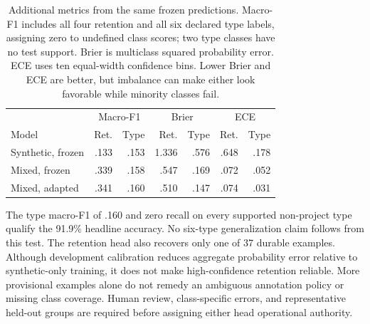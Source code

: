 \begin{table}[htbp]
\centering\small
\begin{tabular}{@{}lrrrrrr@{}}
\toprule
 & \multicolumn{2}{c}{Macro-F1} & \multicolumn{2}{c}{Brier} & \multicolumn{2}{c}{ECE}\\
Model & Ret. & Type & Ret. & Type & Ret. & Type\\
\midrule
Synthetic, frozen & .133 & .153 & 1.336 & .576 & .648 & .178\\
Mixed, frozen & .339 & .158 & .547 & .169 & .072 & .052\\
Mixed, adapted & .341 & .160 & .510 & .147 & .074 & .031\\
\bottomrule
\end{tabular}
\caption{Additional metrics from the same frozen predictions. Macro-F1 includes all four retention and all six declared type labels, assigning zero to undefined class scores; two type classes have no test support. Brier is multiclass squared probability error. ECE uses ten equal-width confidence bins. Lower Brier and ECE are better, but imbalance can make either look favorable while minority classes fail.}
\label{tab:classifier-calibration}
\end{table}

The type macro-F1 of .160 and zero recall on every supported non-project type qualify the 91.9\% headline accuracy. No six-type generalization claim follows from this test. The retention head also recovers only one of 37 durable examples. Although development calibration reduces aggregate probability error relative to synthetic-only training, it does not make high-confidence retention reliable. More provisional examples alone do not remedy an ambiguous annotation policy or missing class coverage. Human review, class-specific errors, and representative held-out groups are required before assigning either head operational authority.
